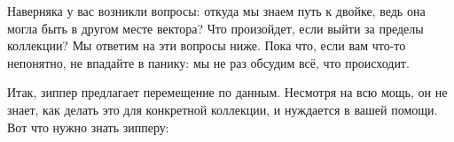 Наверняка у вас возникли вопросы: откуда мы знаем путь к двойке, ведь она могла
быть в другом месте вектора? Что произойдет, если выйти за пределы коллекции?
Мы ответим на эти вопросы ниже. Пока что, если вам что-то непонятно, не впадайте
в панику: мы не раз обсудим всё, что происходит.

Итак, зиппер предлагает перемещение по данным. Несмотря на всю мощь, он не
знает, как делать это для конкретной коллекции, и нуждается в вашей помощи. Вот
что нужно знать зипперу:











